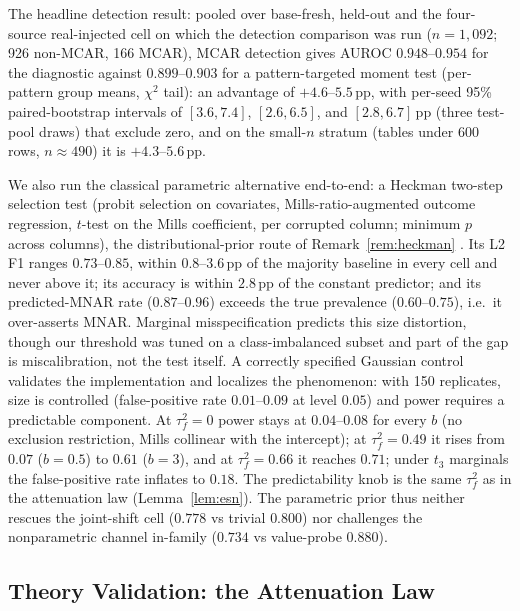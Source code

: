 \documentclass[conference]{IEEEtran}
\begin{document}
The headline detection result: pooled over base-fresh, held-out and the four-source
real-injected cell on which the detection comparison was run ($n=1{,}092$; 926 non-MCAR, 166
MCAR), MCAR detection gives AUROC $0.948$--$0.954$ for the diagnostic against $0.899$--$0.903$
for a pattern-targeted moment test (per-pattern group means, $\chi^2$ tail): an advantage of
$+4.6$--$5.5$\,pp, with per-seed 95\% paired-bootstrap intervals of $[3.6,7.4]$, $[2.6,6.5]$,
and $[2.8,6.7]$\,pp (three test-pool draws) that exclude zero, and on the small-$n$ stratum
(tables under 600 rows, $n\approx490$) it is $+4.3$--$5.6$\,pp.

We also run the classical parametric alternative end-to-end: a Heckman two-step selection test
(probit selection on covariates, Mills-ratio-augmented outcome regression, $t$-test on the Mills
coefficient, per corrupted column; minimum $p$ across columns), the distributional-prior route of
Remark~\ref{rem:heckman} \cite{heckman1979,dk1994}. Its L2 F1 ranges $0.73$--$0.85$, within
$0.8$--$3.6$\,pp of the majority baseline in every cell and never above it; its accuracy is
within $2.8$\,pp of the constant predictor; and its predicted-MNAR rate ($0.87$--$0.96$) exceeds
the true prevalence ($0.60$--$0.75$), i.e.\ it over-asserts MNAR. Marginal misspecification
predicts this size distortion, though our threshold was tuned on a class-imbalanced subset
and part of the gap is miscalibration, not the test itself. A correctly specified
Gaussian control validates the implementation and localizes the phenomenon: with 150 replicates,
size is controlled (false-positive rate $0.01$--$0.09$ at level $0.05$) and power requires a
predictable component. At $\tau_f^2=0$ power stays at $0.04$--$0.08$ for every $b$ (no
exclusion restriction, Mills collinear with the intercept); at $\tau_f^2=0.49$ it rises from
$0.07$ ($b{=}0.5$) to $0.61$ ($b{=}3$), and at $\tau_f^2=0.66$ it reaches $0.71$; under $t_3$
marginals the false-positive rate inflates to $0.18$. The predictability knob is the same
$\tau_f^2$ as in the attenuation law (Lemma~\ref{lem:esn}). The parametric prior thus neither
rescues the joint-shift cell ($0.778$ vs trivial $0.800$) nor challenges the nonparametric
channel in-family ($0.734$ vs value-probe $0.880$).

\subsection{Theory Validation: the Attenuation Law}\label{sec:exp-validate}
\end{document}
